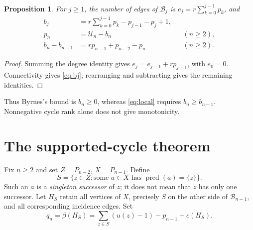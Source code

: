 \documentclass[11pt]{article}
\newtheorem{proposition}[theorem]{Proposition}
\theoremstyle{remark}
\newcommand{\B}{\mathcal B}
\newcommand{\By}{\mathcal U}
\newcommand{\pred}{\operatorname{pred}}
\begin{document}
\begin{proposition}\label{prop:slack}
For $j\ge1$, the number of edges of $\B_j$ is
$e_j=r\sum_{k=0}^{j-1}p_k$, and
\begin{align}
 b_j&=r\sum_{k=0}^{j-1}p_k-p_{j-1}-p_j+1,\label{eq:bj}\\
 p_n&=\By_n-b_n &&(n\ge2),\label{eq:slack}\\
 b_n-b_{n-1}&=r p_{n-1}+p_{n-2}-p_n &&(n\ge2).\label{eq:increment}
\end{align}
\end{proposition}
\begin{proof}
Summing the degree identity gives $e_j=e_{j-1}+rp_{j-1}$, with $e_0=0$.
Connectivity gives \eqref{eq:bj}; rearranging and subtracting gives the
remaining identities.
\end{proof}
Thus Byrnes's bound is $b_n\ge0$, whereas \eqref{eq:local} requires
$b_n\ge b_{n-1}$. Nonnegative cycle rank alone does not give monotonicity.

\newpage
\section{The supported-cycle theorem}
Fix $n\ge2$ and set $Z=P_{n-2}$, $X=P_{n-1}$. Define
\[
 S=\{z\in Z:\text{some }a\in X\text{ has }\pred(a)=\{z\}\}.
\]
Such an $a$ is a \emph{singleton successor} of $z$; it does not mean that
$z$ has only one successor. Let $H_S$ retain all vertices of $X$, precisely
$S$ on the other side of $\B_{n-1}$, and all corresponding incidence edges.
Set
\begin{equation}\label{eq:q}
 q_n=\beta(H_S)
 =\sum_{z\in S}(u(z)-1)-p_{n-1}+c(H_S).
\end{equation}
\end{document}
